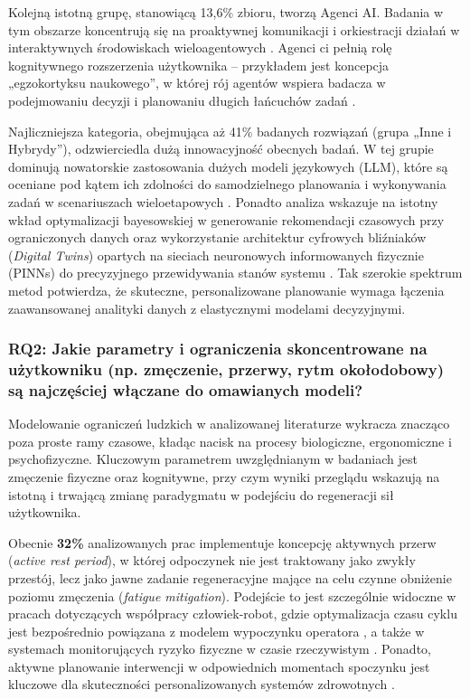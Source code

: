 \indent Kolejną istotną grupę, stanowiącą 13,6\% zbioru, tworzą Agenci AI. Badania w tym obszarze koncentrują się na proaktywnej komunikacji i orkiestracji działań w interaktywnych środowiskach wieloagentowych \cite{orchestration2026}. Agenci ci pełnią rolę kognitywnego rozszerzenia użytkownika – przykładem jest koncepcja „egzokortyksu naukowego”, w której rój agentów wspiera badacza w podejmowaniu decyzji i planowaniu długich łańcuchów zadań \cite{exocortex2024}.

\indent Najliczniejsza kategoria, obejmująca aż 41\% badanych rozwiązań (grupa „Inne i Hybrydy”), odzwierciedla dużą innowacyjność obecnych badań. W tej grupie dominują nowatorskie zastosowania dużych modeli językowych (LLM), które są oceniane pod kątem ich zdolności do samodzielnego planowania i wykonywania zadań w scenariuszach wieloetapowych \cite{LLM2025}. Ponadto analiza wskazuje na istotny wkład optymalizacji bayesowskiej w generowanie rekomendacji czasowych przy ograniczonych danych \cite{bayesian2024} oraz wykorzystanie architektur cyfrowych bliźniaków (\textit{Digital Twins}) opartych na sieciach neuronowych informowanych fizycznie (PINNs) do precyzyjnego przewidywania stanów systemu \cite{twin2025}. Tak szerokie spektrum metod potwierdza, że skuteczne, personalizowane planowanie wymaga łączenia zaawansowanej analityki danych z elastycznymi modelami decyzyjnymi.

\subsubsection{RQ2: Jakie parametry i ograniczenia skoncentrowane na użytkowniku (np. zmęczenie, przerwy, rytm okołodobowy) są najczęściej włączane do omawianych modeli?}
\quad Modelowanie ograniczeń ludzkich w analizowanej literaturze wykracza znacząco poza proste ramy czasowe, kładąc nacisk na procesy biologiczne, ergonomiczne i psychofizyczne. Kluczowym parametrem uwzględnianym w badaniach jest zmęczenie fizyczne oraz kognitywne, przy czym wyniki przeglądu wskazują na istotną i trwającą zmianę paradygmatu w podejściu do regeneracji sił użytkownika. 

\indent Obecnie \textbf{32\%} analizowanych prac implementuje koncepcję aktywnych przerw (\textit{active rest period}), w której odpoczynek nie jest traktowany jako zwykły przestój, lecz jako jawne zadanie regeneracyjne mające na celu czynne obniżenie poziomu zmęczenia (\textit{fatigue mitigation}). Podejście to jest szczególnie widoczne w pracach dotyczących współpracy człowiek-robot, gdzie optymalizacja czasu cyklu jest bezpośrednio powiązana z modelem wypoczynku operatora \cite{dualTask2023, endline2025}, a także w systemach monitorujących ryzyko fizyczne w czasie rzeczywistym \cite{fatigue2025, TaskAllocation2024}. Ponadto, aktywne planowanie interwencji w odpowiednich momentach spoczynku jest kluczowe dla skuteczności personalizowanych systemów zdrowotnych \cite{inTimeRL2021}.


